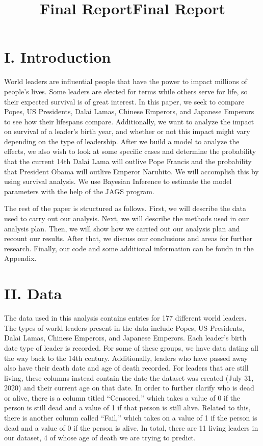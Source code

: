 \documentclass[]{article}
\title{Final Report}
\author{}
\date{}
\title{Final Report}
\author{}
\date{\vspace{-2.5em}}
\begin{document}
\maketitle

\hypertarget{i.-introduction}{%
\section{I. Introduction}\label{i.-introduction}}

World leaders are influential people that have the power to impact
millions of people's lives. Some leaders are elected for terms while
others serve for life, so their expected survival is of great interest.
In this paper, we seek to compare Popes, US Presidents, Dalai Lamas,
Chinese Emperors, and Japanese Emperors to see how their lifespans
compare. Additionally, we want to analyze the impact on survival of a
leader's birth year, and whether or not this impact might vary depending
on the type of leadership. After we build a model to analyze the
effects, we also wish to look at some specific cases and determine the
probability that the current 14th Dalai Lama will outlive Pope Francis
and the probability that President Obama will outlive Emperor Naruhito.
We will accomplish this by using survival analysis. We use Bayesian
Inference to estimate the model parameters with the help of the JAGS
program.

The rest of the paper is structured as follows. First, we will describe
the data used to carry out our analysis. Next, we will describe the
methods used in our analysis plan. Then, we will show how we carried out
our analysis plan and recount our results. After that, we discuss our
conclusions and areas for further research. Finally, our code and some
additional information can be foudn in the Appendix.

\hypertarget{ii.-data}{%
\section{II. Data}\label{ii.-data}}

The data used in this analysis contains entries for 177 different world
leaders. The types of world leaders present in the data include Popes,
US Presidents, Dalai Lamas, Chinese Emperors, and Japanese Emperors.
Each leader's birth date type of leader is recorded. For some of these
groups, we have data dating all the way back to the 14th century.
Additionally, leaders who have passed away also have their death date
and age of death recorded. For leaders that are still living, these
columns instead contain the date the dataset was created (July 31, 2020)
and their current age on that date. In order to further clarify who is
dead or alive, there is a column titled ``Censored,'' which takes a
value of 0 if the person is still dead and a value of 1 if that person
is still alive. Related to this, there is another column called
``Fail,'' which takes on a value of 1 if the person is dead and a value
of 0 if the person is alive. In total, there are 11 living leaders in
our dataset, 4 of whose age of death we are trying to predict.
\end{document}
